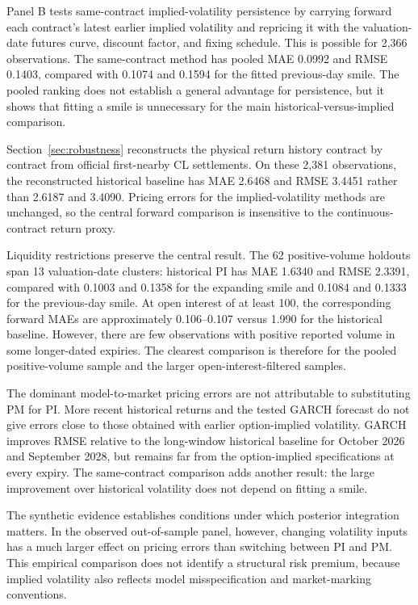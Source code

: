 Panel B tests same-contract implied-volatility persistence by carrying forward each contract's latest earlier implied volatility and repricing it with the valuation-date futures curve, discount factor, and fixing schedule. This is possible for 2,366 observations. The same-contract method has pooled MAE 0.0992 and RMSE 0.1403, compared with 0.1074 and 0.1594 for the fitted previous-day smile. The pooled ranking does not establish a general advantage for persistence, but it shows that fitting a smile is unnecessary for the main historical-versus-implied comparison.

Section~\ref{sec:robustness} reconstructs the physical return history contract by contract from official first-nearby CL settlements. On these 2,381 observations, the reconstructed historical baseline has MAE 2.6468 and RMSE 3.4451 rather than 2.6187 and 3.4090. Pricing errors for the implied-volatility methods are unchanged, so the central forward comparison is insensitive to the continuous-contract return proxy.

Liquidity restrictions preserve the central result. The 62 positive-volume holdouts span 13 valuation-date clusters: historical PI has MAE 1.6340 and RMSE 2.3391, compared with 0.1003 and 0.1358 for the expanding smile and 0.1084 and 0.1333 for the previous-day smile. At open interest of at least 100, the corresponding forward MAEs are approximately 0.106--0.107 versus 1.990 for the historical baseline. However, there are few observations with positive reported volume in some longer-dated expiries. The clearest comparison is therefore for the pooled positive-volume sample and the larger open-interest-filtered samples.

The dominant model-to-market pricing errors are not attributable to substituting PM for PI. More recent historical returns and the tested GARCH forecast do not give errors close to those obtained with earlier option-implied volatility. GARCH improves RMSE relative to the long-window historical baseline for October 2026 and September 2028, but remains far from the option-implied specifications at every expiry. The same-contract comparison adds another result: the large improvement over historical volatility does not depend on fitting a smile.

The synthetic evidence establishes conditions under which posterior integration matters. In the observed out-of-sample panel, however, changing volatility inputs has a much larger effect on pricing errors than switching between PI and PM. This empirical comparison does not identify a structural risk premium, because implied volatility also reflects model misspecification and market-marking conventions.

